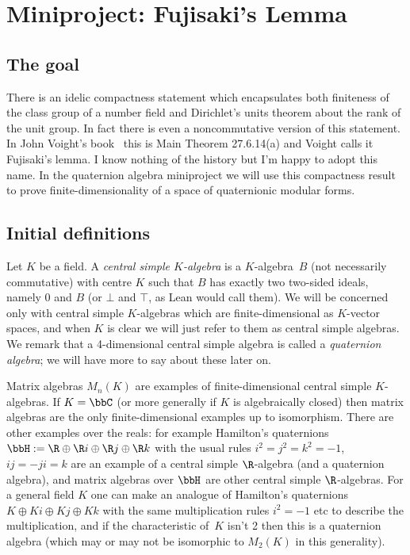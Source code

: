 \chapter{Miniproject: Fujisaki's Lemma}\label{Fujisaki_project}

\section{The goal}

There is an idelic compactness statement which encapsulates both finiteness of the class
group of a number field and Dirichlet's units theorem about the rank of the unit group.
In fact there is even a noncommutative version of this statement. In John Voight's
book~\cite{voightbook} this is Main Theorem 27.6.14(a) and Voight calls it Fujisaki’s lemma.
I know nothing of the history but I'm happy to adopt this name. In the quaternion algebra
miniproject we will use this compactness result to prove finite-dimensionality of a
space of quaternionic modular forms.

\section{Initial definitions}

Let $K$ be a field. A \emph{central simple $K$-algebra} is a $K$-algebra~$B$ (not necessarily
commutative) with centre $K$ such that $B$ has exactly two two-sided ideals, namely ${0}$ and $B$
(or $\bot$ and $\top$, as Lean would call them). We will be concerned
only with central simple $K$-algebras which are finite-dimensional as $K$-vector spaces, and
when $K$ is clear we will just refer to them as central simple algebras. We remark that a
4-dimensional central simple algebra is called a \emph{quaternion algebra}; we will have
more to say about these later on.

Matrix algebras $M_n(K)$ are examples of finite-dimensional central simple $K$-algebras.
If $K=\bbC$ (or more generally if $K$ is algebraically closed)
then matrix algebras are the only finite-dimensional examples
up to isomorphism. There are other examples over the reals: for example Hamilton's quaternions
$\bbH:=\R\oplus\R i\oplus\R j\oplus\R k$ with the usual rules $i^2=j^2=k^2=-1$,
$ij=-ji=k$ are an example of a central simple $\R$-algebra (and a quaternion algebra), and
matrix algebras over $\bbH$ are other central simple $\R$-algebras.
For a general field $K$
one can make an analogue of Hamilton's quaternions $K\oplus Ki\oplus Kj\oplus Kk$ with the
same multiplication rules $i^2=-1$ etc to describe the multiplication, and if the characteristic
of~$K$ isn't 2
then this is a quaternion algebra (which may or may not be isomorphic to $M_2(K)$ in this
generality).

